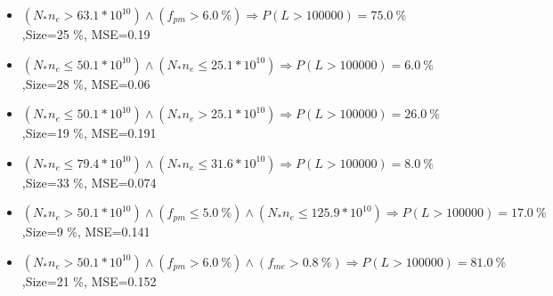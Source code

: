 \documentclass[numbered]{CSL}
\begin{document}
\begin{itemize}
\item $(N_* n_e > 63.1 * 10^{10}) \land (f_{pm} > 6.0~\%) \Rightarrow P(L > 100 000) = 75.0~\%$,\hfill Size=25 \%, MSE=0.19
\item $(N_* n_e \leq 50.1 * 10^{10}) \land (N_* n_e \leq 25.1 * 10^{10}) \Rightarrow P(L > 100 000) = 6.0~\%$,\hfill Size=28 \%, MSE=0.06
\item $(N_* n_e \leq 50.1 * 10^{10}) \land (N_* n_e > 25.1 * 10^{10}) \Rightarrow P(L > 100 000) = 26.0~\%$,\hfill Size=19 \%, MSE=0.191
\item $(N_* n_e \leq 79.4 * 10^{10}) \land (N_* n_e \leq 31.6 * 10^{10}) \Rightarrow P(L > 100 000) = 8.0~\%$,\hfill Size=33 \%, MSE=0.074
\item $(N_* n_e > 50.1 * 10^{10}) \land (f_{pm} \leq 5.0~\%) \land (N_* n_e \leq 125.9 * 10^{10}) \Rightarrow P(L > 100 000) = 17.0~\%$,\hfill Size=9 \%, MSE=0.141
\item $(N_* n_e > 50.1 * 10^{10}) \land (f_{pm} > 6.0~\%) \land (f_{me} > 0.8~\%) \Rightarrow P(L > 100 000) = 81.0~\%$,\hfill Size=21 \%, MSE=0.152
\end{itemize}
\end{document}
